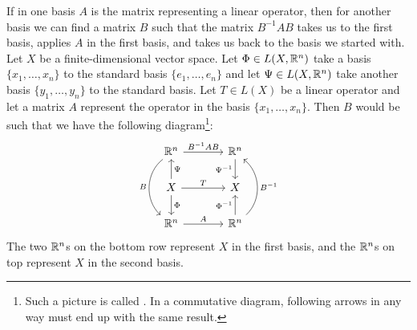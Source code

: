 If in one basis $A$ is the matrix representing a
linear operator, then for another basis we can find a matrix $B$ such
that the matrix $B^{-1}AB$ takes us to the first basis, applies $A$ in the
first basis, and takes us back to the basis we started with.
Let $X$ be a finite-dimensional vector space.
Let $\Phi \in L(X,{\mathbb{R}}^n)$ take a basis $\{ x_1,\ldots,x_n \}$ to the
standard basis $\{ e_1,\ldots,e_n \}$ and let $\Psi \in L(X,{\mathbb{R}}^n)$
take another basis $\{ y_1, \ldots, y_n \}$ to the standard basis.
Let $T \in L(X)$ be a linear operator and let a matrix $A$
represent the operator
in the basis $\{ x_1,\ldots,x_n \}$.
Then $B$ would be such that we have the following diagram\footnote{%
Such a picture is called \emph{}.
In a commutative diagram,
following arrows in any way must end up with the same result.}:
\begin{equation*}
\begin{tikzcd}[row sep=normal,column sep=large]
\R^n \ar[r, "B^{-1}AB"]  \ar[dd, bend right=50, "B"'] &
  \R^n \ar[d, "\Psi^{-1}"'] \\
X \ar[r, "T"] \ar[u, "\Psi"'] \ar[d, "\Phi"]        &
  X \\
\R^n \ar[r, "A"]                                      &
  \R^n \ar[u, "\Phi^{-1}"] \ar[uu, bend right=50, "B^{-1}"'] 
\end{tikzcd}
\end{equation*}
The two ${\mathbb{R}}^n$s on the bottom row represent
$X$ in the first basis, and the ${\mathbb{R}}^n$s on top represent $X$ in the
second
basis.

